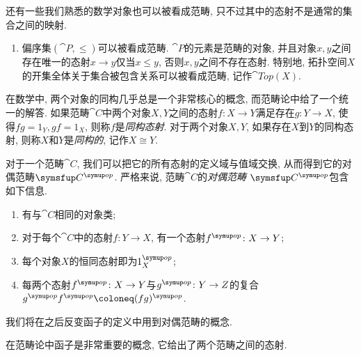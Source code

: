 \begin{example}
  还有一些我们熟悉的数学对象也可以被看成范畴, 只不过其中的态射不是通常的集合之间的映射.
  \begin{enumerate}
    \item 偏序集$(\cat{P}, \leq)$可以被看成范畴. $\cat{P}$的元素是范畴的对象, 并且对象$x, y$之间存在唯一的态射$x\to y$仅当$x\leq y$, 否则$x, y$之间不存在态射. 特别地, 拓扑空间$X$的开集全体关于集合被包含关系可以被看成范畴, 记作$\cat{Top}(X)$.
  \end{enumerate}
\end{example}

在数学中, 两个对象的同构几乎总是一个非常核心的概念, 而范畴论中给了一个统一的解答. 如果范畴$\cat{C}$中两个对象$X, Y$之间的态射$f\colon X\to Y$满足存在$g\colon Y\to X$, 使得$fg=1_Y, gf=1_X$, 则称$f$是\emph{同构态射}. 对于两个对象$X, Y$, 如果存在$X$到$Y$的同构态射, 则称$X$和$Y$是\emph{同构的}, 记作$X\cong Y$.

对于一个范畴$\cat{C}$, 我们可以把它的所有态射的定义域与值域交换, 从而得到它的对偶范畴$\cat{C}^{\op}$. 严格来说, 范畴$\cat{C}$的\emph{对偶范畴} $\cat{C}^{\op}$包含如下信息.
\begin{enumerate}
  \item 有与$\cat{C}$相同的对象类;
  \item 对于每个$\cat{C}$中的态射$f\colon Y\to X$, 有一个态射$f^{\op}\colon X\to Y$;
  \item 每个对象$X$的恒同态射即为$1_X^{\op}$;
  \item 每两个态射$f^{\op}\colon X\to Y$与$g^{\op}\colon Y\to Z$的复合$g^{\op}f^{\op}\coloneq (fg)^{\op}$.
\end{enumerate}
我们将在之后反变函子的定义中用到对偶范畴的概念.

在范畴论中函子是非常重要的概念, 它给出了两个范畴之间的态射.

